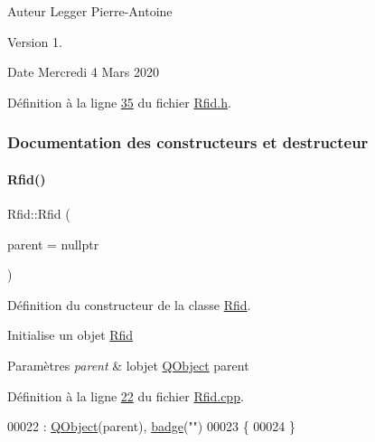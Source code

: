 \begin{DoxyAuthor}{Auteur}
Legger Pierre-\/\+Antoine
\end{DoxyAuthor}
\begin{DoxyVersion}{Version}
1.
\end{DoxyVersion}
\begin{DoxyDate}{Date}
Mercredi 4 Mars 2020 
\end{DoxyDate}


Définition à la ligne \hyperlink{_rfid_8h_source_l00035}{35} du fichier \hyperlink{_rfid_8h_source}{Rfid.\+h}.



\subsubsection{Documentation des constructeurs et destructeur}
\mbox{\label{class_rfid_aa00c7163ce0e3fda6596353d40a458a9}} 
\paragraph{\texorpdfstring{Rfid()}{Rfid()}}
{\footnotesize\ttfamily Rfid\+::\+Rfid (\begin{DoxyParamCaption}\item[{\hyperlink{class_q_object}{Q\+Object} $\ast$}]{parent = {\ttfamily nullptr} }\end{DoxyParamCaption})}



Définition du constructeur de la classe \hyperlink{class_rfid}{Rfid}. 

Initialise un objet \hyperlink{class_rfid}{Rfid} 
\begin{DoxyParams}{Paramètres}
{\em parent} & l\textquotesingle{}objet \hyperlink{class_q_object}{Q\+Object} parent \\
\hline
\end{DoxyParams}


Définition à la ligne \hyperlink{_rfid_8cpp_source_l00022}{22} du fichier \hyperlink{_rfid_8cpp_source}{Rfid.\+cpp}.


\begin{DoxyCode}
00022                           : \hyperlink{class_q_object}{QObject}(parent), \hyperlink{class_rfid_ac634cd26ffbe1c6da3967dc4af53b734}{badge}(\textcolor{stringliteral}{""})
00023 \{
00024 \}
\end{DoxyCode}
\mbox{\label{class_rfid_a563836053a71a9fdc566a812da0cf5c1}} 
